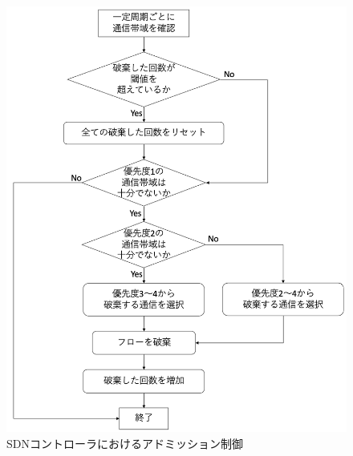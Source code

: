 \documentclass[a4paper,10pt,twocolumn,uplatex]{jsarticle}
\begin{document}
\begin{figure}[t]
	\begin{centering}
    \includegraphics[width=0.8\linewidth]{img/adomission_centering.png}
    \caption{SDNコントローラにおけるアドミッション制御}
    \label{tab:adomission}
    \end{centering}
\end{figure}

\end{document}
